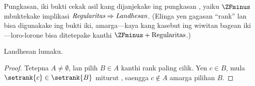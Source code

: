 \documentclass[../../../include/open-logic-section]{subfiles}
\begin{document}
Pungkasan, iki bukti cekak asil kang dijanjekake
ing pungkasan , yaiku
$\ZFminus$ mbuktekake implikasi
$\emph{Regularitas} \Rightarrow \emph{Landhesan}$.
(Elinga yen gagasan ``rank'' lan
 bisa digunakake ing
bukti iki, amarga---kaya kang kasebut ing
wiwitan bagean iki---loro-lorone bisa
ditetepake kanthi $\ZFminus + \text{Regularitas}$.)

\begin{prop} Landhesan lumaku.
\end{prop}

\begin{proof}
Tetepna $A \neq \emptyset$, lan pilih
$B \in A$ kanthi rank paling cilik. Yen
$c \in B$, mula $\setrank{c} \in \setrank{B}$
miturut , saengga
$c \notin A$ amarga pilihan $B$.
\end{proof}
\end{document}
